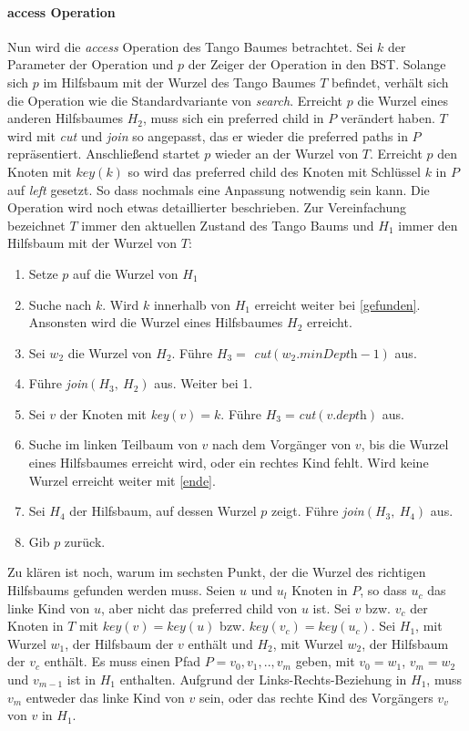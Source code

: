 \documentclass[a4paper,12pt]{article}
\begin{document}
\paragraph{access Operation}
Nun wird die \textit{access} Operation des Tango Baumes betrachtet. Sei $k$ der Parameter der Operation und $p$ der Zeiger der Operation in den BST. Solange sich $p$ im Hilfsbaum mit der Wurzel des Tango Baumes $T$ befindet, verhält sich die Operation wie die Standardvariante von \textit{search}. Erreicht $p$ die Wurzel eines anderen Hilfsbaumes $H_2$, muss sich ein preferred child in $P$ verändert haben. $T$ wird mit \textit{cut} und \textit{join} so angepasst, das er wieder die preferred paths in $P$ repräsentiert. Anschließend startet $p$ wieder an der Wurzel von $T$. Erreicht $p$ den Knoten mit $\mathit{key}\left(k\right)$ so wird das preferred child des Knoten mit Schlüssel $k$ in $P$ auf \textit{left} gesetzt. So dass nochmals eine Anpassung notwendig sein kann. Die Operation wird noch etwas detaillierter beschrieben. Zur Vereinfachung bezeichnet $T$ immer den aktuellen Zustand des Tango Baums und $H_1$ immer den Hilfsbaum mit der Wurzel von $T$:
\begin{enumerate}
	\item Setze $p$ auf die Wurzel von $H_1$
	\item Suche nach $k$. Wird $k$ innerhalb von $H_1$ erreicht weiter bei \ref{gefunden}. Ansonsten wird die Wurzel eines Hilfsbaumes $H_2$ erreicht.
	\item Sei $w_2$ die Wurzel von $H_2$. Führe $H_3 =$ \textit{cut}$\left(w_2.\textit{minDepth} - 1\right)$ aus.
	\item Führe \textit{join}$\left(H_3, ~H_2\right)$ aus. Weiter bei 1.
	\item \label{gefunden} Sei $v$ der Knoten mit \textit{key}$\left(v\right) = k$. Führe $H_3=$\textit{cut}$ \left(v.\textit{depth}\right)$ aus. 
	\item Suche im linken Teilbaum von $v$ nach dem Vorgänger von $v$, bis die Wurzel eines Hilfsbaumes erreicht wird, oder ein rechtes Kind fehlt. Wird keine Wurzel erreicht weiter mit \ref{ende}.
	\item Sei $H_4$ der Hilfsbaum, auf dessen Wurzel $p$ zeigt. Führe \textit{join}$\left(H_3, ~H_4\right)$ aus.
	\item \label{ende} Gib $p$ zurück.
\end{enumerate}
Zu klären ist noch, warum im sechsten Punkt, der die Wurzel des richtigen Hilfsbaums gefunden werden muss. Seien $u$ und $u_l$ Knoten in $P$, so dass $u_c$ das linke Kind von $u$, aber nicht das preferred child von $u$ ist. Sei $v$ bzw. $v_c$ der Knoten in $T$ mit $\mathit{key}\left(v\right) = \mathit{key}\left(u\right)$ bzw. $\mathit{key}\left(v_c\right) = \mathit{key}\left(u_c\right)$. Sei $H_1$, mit Wurzel $w_1$, der Hilfsbaum der $v$ enthält und $H_2$, mit Wurzel $w_2$, der Hilfsbaum der $v_c$ enthält. Es muss einen Pfad $P = v_0, v_1,.., v_m $ geben, mit $v_0 = w_1$, $v_m = w_2$ und $v_{m-1}$ ist in $H_1$ enthalten. Aufgrund der Links-Rechts-Beziehung in $H_1$, muss $v_m$ entweder das linke Kind von $v$ sein, oder das rechte Kind des Vorgängers $v_v$ von $v$ in $H_1$. \\
\end{document}
